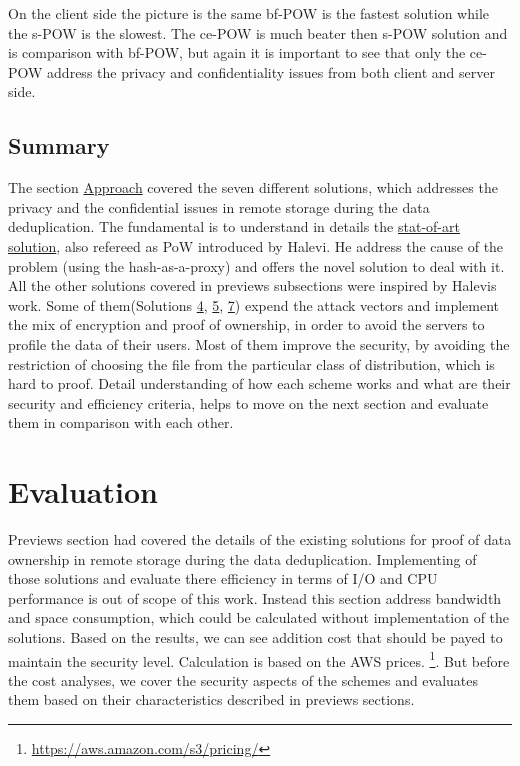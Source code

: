 \documentclass[12pt]{article}
\begin{document}
On the client side the picture is the same bf-POW is the fastest solution while the s-POW is the slowest. The ce-POW is much beater then s-POW solution and is comparison with bf-POW, but again it is important to see that only the ce-POW address the privacy and confidentiality issues from both client and server side.


\subsection{Summary}
\label{subsub:ApproachSummary}

The section \hyperref[sec:4]{Approach} covered the seven different solutions, which addresses the privacy and the confidential issues in remote storage during the data deduplication. The fundamental is to understand in details  the \hyperref[sub:Soltuion1]{stat-of-art solution}, also refereed as PoW introduced by Halevi. He address the cause of the problem (using the hash-as-a-proxy) and offers the novel solution to deal with it. All the other solutions covered in previews subsections were inspired by Halevis work. Some of them(Solutions \hyperref[sub:Soltuion4]{4}, \hyperref[sub:Soltuion4]{5}, \hyperref[sub:Soltuion4]{7}) expend the  attack vectors and implement the mix of encryption and proof of ownership, in order to avoid the servers to profile the data of their users. Most of them improve the security, by avoiding the restriction of choosing the file from the particular class of distribution, which is hard to proof. Detail understanding of how each scheme works and what are their security and efficiency criteria, helps to move on the next section and evaluate them in comparison with each other.  

\pagebreak

\section{Evaluation}
\label{sec:5}
Previews section had covered the details of the existing solutions for proof of data ownership in remote storage during the data deduplication. Implementing of those solutions and evaluate there efficiency in terms of I/O and CPU performance is out of scope of this work. Instead this section address bandwidth and space consumption, which could be calculated without implementation of the solutions. Based on the results, we can see addition cost that should be payed to maintain the security level. Calculation is  based on the AWS prices. \footnote{\url{https://aws.amazon.com/s3/pricing/}}. But before the cost analyses, we cover the security aspects of the schemes and evaluates them based on their characteristics described in previews sections.
\end{document}
